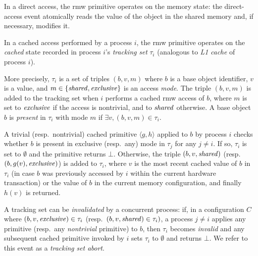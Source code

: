 In a direct access, the rmw primitive operates on the memory state:
the direct-access event atomically reads the value of the object in
the shared memory and, if necessary, modifies it.

In a cached access performed by a process $i$, the rmw primitive operates on the \emph{cached}
state recorded in process $i$'s \emph{tracking set} $\tau_i$ (analogous to \emph{L1 cache} of process $i$). 
 
More precisely, $\tau_i$ is a set of triples $(b, v, m)$ where $b$ is a base object identifier, $v$ is a value, 
and $m \in \{\mathit{shared}, \mathit{exclusive}\}$ is an access \emph{mode}. 
The triple $(b, v, m)$ is added to the tracking set when $i$ performs a cached
rmw access of $b$, where $m$ is set to $\mathit{exclusive}$ if the access is
nontrivial, and to $\mathit{shared}$ otherwise.  
A base object $b$ is \emph{present} in $\tau_i$ with mode $m$ if $\exists v, (b,v,m) \in \tau_i$.

A trivial (resp.\ nontrivial) 
cached primitive $\langle g,h \rangle$ applied to $b$ 
by process $i$ 
checks whether $b$ is present in exclusive
(resp.\ any) mode in $\tau_j$ 
for any $j\neq i$. If so, $\tau_i$ is set to $\emptyset$ and the
primitive returns $\bot$. 
%
Otherwise, the triple $(b, v, \mathit{shared})$ (resp. $(b, g(v), \mathit{exclusive})$)
is added to $\tau_i$,  where $v$ is the most recent cached value of $b$ in $\tau_i$
(in case $b$ was previously accessed by $i$ within the current
hardware transaction) or the value of $b$ in the current
memory configuration, and finally $h(v)$ is returned.
%

A tracking set can be \emph{invalidated} by a concurrent process: 
if, in a configuration $C$ where  $(b,v,\mathit{exclusive})\in\tau_i$
(resp.\ $(b,v,\mathit{shared})\in\tau_i)$,  a process $j\neq i$ applies any primitive 
(resp.\ any \emph{nontrivial} primitive) to $b$, then $\tau_i$ becomes
\emph{invalid} and any subsequent cached primitive invoked by $i$
sets $\tau_i$ to $\emptyset$ and returns $\bot$. We refer to this event as a \emph{tracking set abort}.

